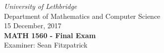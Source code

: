 \documentclass[12pt]{article}
\newcommand{\skipline}{\vspace{12pt}}
\begin{document}
\author{Instructor: Sean Fitzpatrick}
\thispagestyle{plain}
\begin{center}
\emph{University of Lethbridge}\\
Department of Mathematics and Computer Science\\
15 December, 2017\\
{\bf MATH 1560 - Final Exam}\\
Examiner: Sean Fitzpatrick
\end{center}
\end{document}
